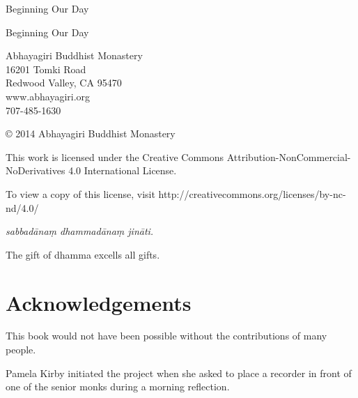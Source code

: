 \documentclass[11pt,openany]{memoir}
\begin{document}

\frontmatter
{}
\pagestyle{empty}

{\center
\vspace*{80pt}
\huge
Beginning Our Day

\par}
\clearpage

\thispagestyle{empty}
{\footnotesize\raggedright
{}

Beginning Our Day

\vspace{1em}
Abhayagiri Buddhist Monastery\\
16201 Tomki Road\\
Redwood Valley, CA 95470\\
www.abhayagiri.org\\
707-485-1630

\vspace{1em}
\copyright{} 2014 Abhayagiri Buddhist Monastery

\vspace{1em}
This work is licensed under the Creative Commons
Attribution-NonCommercial-NoDerivatives 4.0 International License.

To view a copy of this license, visit
http://creativecommons.org/licenses/by-nc-nd/4.0/

\vspace{1em}

\textit{sabbadānaṃ dhammadānaṃ jināti.}

The gift of dhamma excells all gifts.
}

\clearpage


\pagestyle{plain}
\tableofcontents*

\setlength{\afterchapskip}{15pt}

\clearpage

\thispagestyle{empty}
\mbox{} \clearpage

\chapter{Acknowledgements}

This book would not have been possible without the contributions of many
people.

Pamela Kirby initiated the project when she asked to place a recorder in
front of one of the senior monks during a morning reflection.
\end{document}
